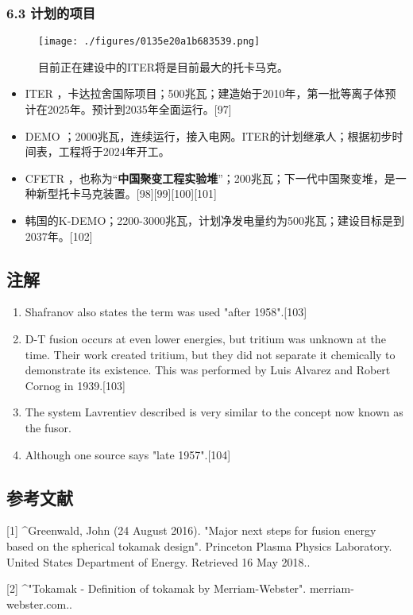 \subsubsection{6.3 计划的项目}
\begin{figure}[ht]
\centering
\texttt{[image: ./figures/0135e20a1b683539.png]}
\caption{目前正在建设中的ITER将是目前最大的托卡马克。} \label{fig_TKMK_10}
\end{figure}
\begin{itemize}
\item ITER ，卡达拉舍国际项目；500兆瓦；建造始于2010年，第一批等离子体预计在2025年。预计到2035年全面运行。[97]
\item DEMO ；2000兆瓦，连续运行，接入电网。ITER的计划继承人；根据初步时间表，工程将于2024年开工。
\item CFETR ，也称为“\textbf{中国聚变工程实验堆}”；200兆瓦；下一代中国聚变堆，是一种新型托卡马克装置。[98][99][100][101]
\item 韩国的K-DEMO；2200-3000兆瓦，计划净发电量约为500兆瓦；建设目标是到2037年。[102]
\end{itemize}

\subsection{注解}
\begin{enumerate}
\item Shafranov also states the term was used "after 1958".[103]
\item D-T fusion occurs at even lower energies, but tritium was unknown at the time. Their work created tritium, but they did not separate it chemically to demonstrate its existence. This was performed by Luis Alvarez and Robert Cornog in 1939.[103]
\item The system Lavrentiev described is very similar to the concept now known as the fusor.
\item Although one source says "late 1957".[104]
\end{enumerate}

\subsection{参考文献}
[1]
^Greenwald, John (24 August 2016). "Major next steps for fusion energy based on the spherical tokamak design". Princeton Plasma Physics Laboratory. United States Department of Energy. Retrieved 16 May 2018..

[2]
^"Tokamak - Definition of tokamak by Merriam-Webster". merriam-webster.com..

